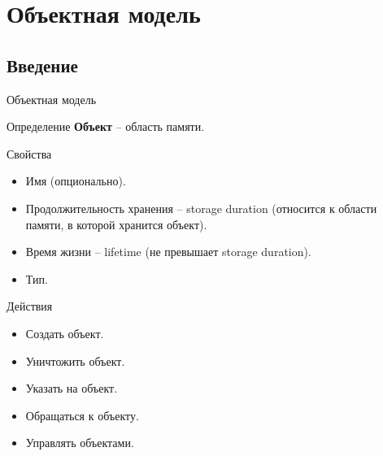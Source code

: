 \documentclass[xetex,mathserif,serif,10pt]{beamer}
\begin{document}
    \section{Объектная модель}
    \subsection{Введение}
    \begin{frame}{Объектная модель}
        \begin{block}{Определение}
            \textbf{Объект} -- область памяти.
        \end{block}
        \begin{block}{Свойства}
            \begin{itemize}
                \item Имя (опционально).
                \item Продолжительность хранения -- storage duration (относится к области памяти, в которой хранится объект).
                \item Время жизни -- lifetime (не превышает storage duration).
                \item Тип.
            \end{itemize}
        \end{block}
        \begin{block}{Действия}
            \begin{itemize}
                \item Создать объект.
                \item Уничтожить объект.
                \item Указать на объект.
                \item Обращаться к объекту.
                \item Управлять объектами.
            \end{itemize}
        \end{block}
    \end{frame}
\end{document}
